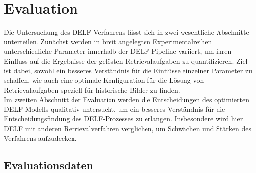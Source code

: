 \chapter{Evaluation}

Die Untersuchung des DELF-Verfahrens lässt sich in zwei wesentliche Abschnitte unterteilen. Zunächst werden in breit angelegten Experimentalreihen unterschiedliche Parameter innerhalb der DELF-Pipeline variiert, um ihren Einfluss auf die Ergebnisse der gelösten Retrievalaufgaben zu quantifizieren. Ziel ist dabei, sowohl ein besseres Verständnis für die Einflüsse einzelner Parameter zu schaffen, wie auch eine optimale Konfiguration für die Lösung von Retrievalaufgaben speziell für historische Bilder zu finden. \\
Im zweiten Abschnitt der Evaluation werden die Entscheidungen des optimierten DELF-Modells qualitativ untersucht, um ein besseres Verständnis für die Entscheidungsfindung des DELF-Prozesses zu erlangen. Insbesondere wird hier DELF mit anderen Retrievalverfahren verglichen, um Schwächen und Stärken des Verfahrens aufzudecken.

\section{Evaluationsdaten}

